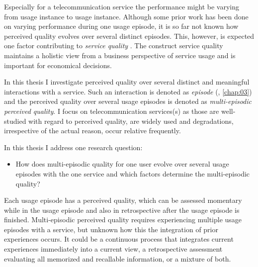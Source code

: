 Especially for a telecommunication service the performance might be varying from usage instance to usage instance.
Although some prior work has been done on varying performance during one usage episode, it is so far not known how perceived quality evolves over several distinct episodes.
This, however, is expected one factor contributing to \emph{service quality} \citep[\cf,][]{zeithaml_behavioral_1996}.
The construct service quality maintains a holistic view from a business perspective of service usage and is important for economical decisions.

In this thesis I investigate perceived quality over several distinct and meaningful interactions with a service.
Such an interaction is denoted as \emph{episode} (\cf, \autoref{chap:03}) and the perceived quality over several usage episodes is denoted as \emph{multi-episodic perceived quality}. %
I focus on telecommunication services(s) as those are well-studied with regard to perceived quality, are widely used and degradations, irrespective of the actual reason, occur relative frequently.

In this thesis I address one research question: \\
\begin{itemize}
\item How does multi-episodic quality for one user evolve over several usage episodes with the one service and which factors determine the multi-episodic quality?
\end{itemize}


Each usage episode has a perceived quality, which can be assessed momentary while in the usage episode and also in retrospective after the usage episode is finished.
Multi-episodic perceived quality requires experiencing multiple usage episodes with a service, but unknown how this the integration of prior experiences occurs.
It could be a continuous process that integrates current experiences immediately into a current view, a retrospective assessment evaluating all memorized and recallable information, or a mixture of both.

